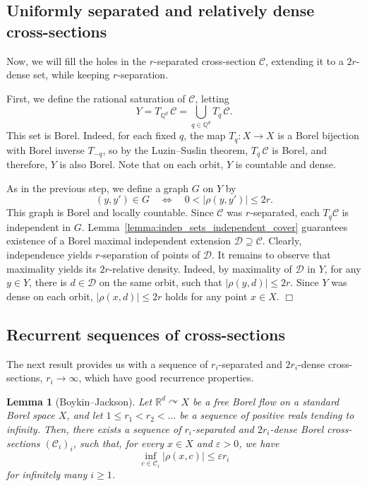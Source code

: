 \documentclass[11pt]{paper}
\newtheorem{lemma}{Lemma}
\newcommand{\bR}{\mathbb R}
\newcommand{\bQ}{\mathbb Q}
\newcommand{\cD}{\mathcal D}
\newcommand{\cC}{\mathcal C}
\newcommand{\eps}{\varepsilon}
\begin{document}
\subsection{Uniformly separated and relatively dense cross-sections}
\label{subsect:rel-dense}
Now, we will fill the holes in the $r$-separated cross-section $\cC$, extending it to a $2r$-dense
set, while keeping $r$-separation.

First, we define the rational saturation of $\cC$, letting
\[
Y = T_{\bQ^d}\, \cC = \bigcup_{q\in\bQ^d} T_q\, \cC.
\]
This set is Borel. Indeed, for each fixed $q$, the map $T_q\colon X\to X$ is a Borel bijection with
Borel inverse $T_{-q}$, so by the Luzin--Suslin theorem, $T_q\, \cC$ is Borel, and therefore,
$Y$ is also Borel.  Note that on each orbit, $Y$ is countable and dense.

As in the previous step, we define a graph $G$ on $Y$ by
\[
(y, y')\in G \quad \Longleftrightarrow \quad 0 < | \rho(y, y') | \le 2r.
\]
This graph is Borel and locally countable. Since $\cC$ was $r$-separated, each $T_{q}\mathcal{C}$ is
independent in $G$. Lemma~\ref{lemma:indep_sets_independent_cover} guarantees existence of a Borel
maximal independent extension  \(\cD\supseteq \cC\). Clearly, independence yields $r$-separation of points of $\cD$. It
remains to observe that maximality yields its $2r$-relative density.  Indeed, by maximality of $\cD$
in $Y$, for any $y\in Y$, there is $d\in \cD$ on the same orbit, such that
$| \rho (y, d) |\le 2r$. Since $Y$ was dense on each orbit, $| \rho (x, d) |\le 2r$ holds for any point
$x\in X$. \mbox{} \hfill $\Box$


\subsection{Recurrent sequences of cross-sections}
\noindent The next result provides us with a sequence of $r_i$-separated and $2r_i$-dense
cross-sections, $r_i\to\infty$, which have good recurrence properties.


\begin{lemma}[Boykin--Jackson]
\label{thm:Boykin-Jackson}
Let $\bR^d\curvearrowright X$ be a free Borel flow
on a standard Borel space $X$, and let
$1\le r_1<r_2<\ldots$ be a sequence of positive
reals tending to infinity. Then, there exists a sequence
of  $r_i$-separated and $2r_i$-dense Borel cross-sections $(\cC_i)_i$, such that,
for every $x\in X$ and $\eps>0$,  we have
\[
\inf_{c\in\cC_i} |\rho(x, c)| \le \eps r_i
\]
for infinitely many $i\ge 1$.
\end{lemma}
\end{document}
